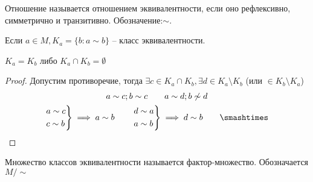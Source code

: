 \documentclass[main]{subfiles}
\begin{document}
\begin{definition}
    Отношение называется отношением эквивалентности, если оно рефлексивно,
    симметрично и транзитивно. Обозначение:$\sim$.
\end{definition}

\begin{definition}
    Если $a \in M, K_a = \{b: a \sim b\}$ -- класс эквивалентности.
\end{definition}

\begin{theorem}
    $K_a = K_b$ либо $K_a \cap K_b = \emptyset$
\end{theorem}
\begin{proof}
    Допустим противоречие, тогда $\exists c \in K_a \cap K_b,
        \exists d \in K_a \setminus K_b$ (или $\in K_b \setminus K_a$)
    \begin{gather*}
        a\sim c; b\sim c \qquad a \sim d; b \not\sim d\\
        \begin{rcases}
            a\sim c \\
            c\sim b
        \end{rcases} \implies a\sim b \qquad
        \begin{rcases}
            d \sim a \\
            a \sim b
        \end{rcases} \implies d \sim b \qquad\contradiction
    \end{gather*}
\end{proof}

\begin{definition}
    Множество классов эквивалентности называется фактор-множество. Обозначается $M/\sim$
\end{definition}
\end{document}
